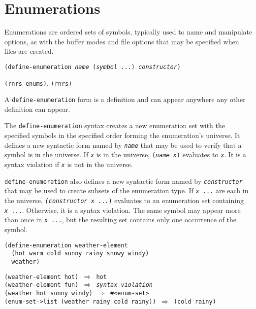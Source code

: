\section{\label{objects_g120}\label{objects_h14}Enumerations\label{objects_SECTENUMERATIONS}}



Enumerations are ordered sets of symbols, typically used to name and manipulate
options, as with the buffer modes and file options that may be specified when
files are created.

\begin{description}

\label{objects_s290}\item[syntax] \texttt{(define-enumeration \textit{name} (\textit{symbol} ...) \textit{constructor})}



\item[libraries] \texttt{(rnrs enums)}, \texttt{(rnrs)}
\end{description}


A \texttt{define-enumeration} form is a definition and can appear
anywhere any other definition can appear.


The \texttt{define-enumeration} syntax creates a new enumeration set with
the specified symbols in the specified order forming the enumeration's universe.
It defines a new syntactic form named by \texttt{\textit{name}} that may be used to verify
that a symbol is in the universe.
If \texttt{\textit{x}} is in the universe, \texttt{(\textit{name \textit{x}})} evaluates to
\texttt{\textit{x}}.
It is a syntax violation if \texttt{\textit{x}} is not in the universe.

\texttt{define-enumeration} also defines
a new syntactic form named by \texttt{\textit{constructor}} that may be used to create
subsets of the enumeration type.
If \texttt{\textit{x} ...} are each in the universe,
\texttt{\textit{(constructor \textit{x}} ...)} evaluates to an enumeration set
containing \texttt{\textit{x} ...}.
Otherwise, it is a syntax violation.
The same symbol may appear more than once in \texttt{\textit{x} ...},
but the resulting set contains only one occurrence of the symbol.

\begin{alltt}
(define-enumeration weather-element
  (hot warm cold sunny rainy snowy windy)
  weather)

(weather-element hot) \(\Rightarrow\) hot
(weather-element fun) \(\Rightarrow\) \textit{syntax violation}
(weather hot sunny windy) \(\Rightarrow\) \#{}\textless{}enum-set\textgreater{}
(enum-set-\textgreater{}list (weather rainy cold rainy)) \(\Rightarrow\) (cold rainy)
\end{alltt}

